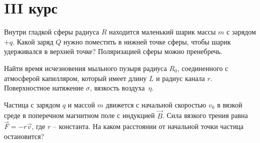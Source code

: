 \section{III курс}

\AddProb Внутри гладкой сферы радиуса $R$ находится маленький шарик массы $m$ с зарядом $+q$. Какой заряд $Q$ нужно поместить в нижней точке сферы, 
чтобы шарик удерживался в верхней точке? Поляризацией сферы можно пренебречь.

\AddProb Найти время исчезновения мыльного пузыря радиуса $R_0$, соединенного с атмосферой капилляром, который имеет длину $L$ и радиус канала $r$. 
Поверхностное натяжение $\sigma$, вязкость воздуха~$\eta$.

\AddProb Частица с зарядом $q$ и массой $m$ движется с начальной скоростью $v_0$ в вязкой среде в поперечном магнитном поле с индукцией $\vec B$. 
Сила вязкого трения равна $\vec F = -r\vec v$, где $r$ -- константа. На каком расстоянии от начальной точки частица остановится?